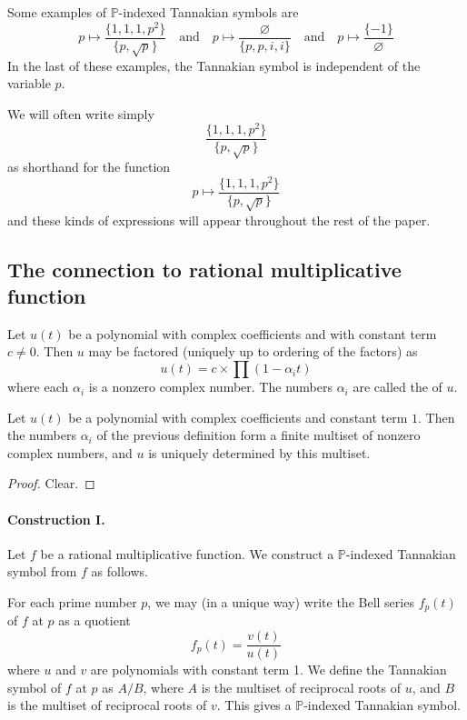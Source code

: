 \begin{example}
Some examples of $\mathbb{P}$-indexed Tannakian symbols are
$$ p \mapsto \frac{   \{  1,1, 1, p^2  \}   }{  \{  p, \sqrt{p}  \}   } \quad \textrm{and} \quad p \mapsto \frac{   \varnothing   }{  \{  p, p, i, i  \}   }   \quad \textrm{and} \quad p \mapsto \frac{  \{ -1  \}   }{     \varnothing }    $$
In the last of these examples, the Tannakian symbol is independent of the variable $p$. 
\end{example}

We will often write simply
$$  \frac{   \{  1,1, 1, p^2  \}   }{  \{  p, \sqrt{p}  \}   }$$
as shorthand for the function
$$ p \mapsto \frac{   \{  1,1, 1, p^2  \}   }{  \{  p, \sqrt{p}  \}   } $$
and these kinds of expressions will appear throughout the rest of the paper.

\subsection{The connection to rational multiplicative function}

\begin{definition}
Let $u(t)$ be a polynomial with complex coefficients and with constant term $c \neq 0$. Then $u$ may be factored (uniquely up to ordering of the factors) as 
$$  u(t) =  c \times \prod(1 - \alpha_i t)  $$
where each $\alpha_i$ is a nonzero complex number. The numbers $\alpha_i$ are called the  of $u$.
\end{definition}

\begin{lemma}
Let $u(t)$ be a polynomial with complex coefficients and constant term $1$. Then the numbers $\alpha_i$ of the previous definition form a finite multiset of nonzero complex numbers, and $u$ is uniquely determined by this multiset.
\end{lemma}
\begin{proof}
Clear.
\end{proof}

\paragraph{Construction I.} Let $f$ be a rational multiplicative function. We construct a $\mathbb{P}$-indexed Tannakian symbol from $f$ as follows.

For each prime number $p$, we may (in a unique way) write the Bell series $f_p(t)$ of $f$ at $p$ as a quotient
$$ f_p(t) = \frac{v(t)}{u(t) }   $$
where $u$ and $v$ are polynomials with constant term 1. We define the Tannakian symbol of $f$ at $p$ as $A/B$, where $A$ is the multiset of reciprocal roots of $u$, and $B$ is the multiset of reciprocal roots of $v$. This gives a $\mathbb{P}$-indexed Tannakian symbol.

